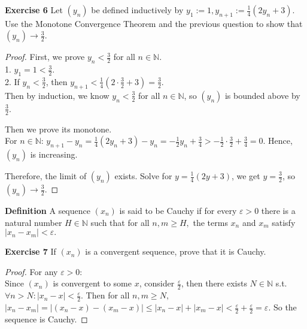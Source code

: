 \documentclass[12pt]{article}
\newcommand{\bbN}{\mathbb{N}}
\theoremstyle{definition}
\numberwithin{equation}{subsection}
\begin{document}
\textbf{Exercise 6} Let $\left(y_{n}\right)$ be defined inductively by $y_{1}:=1, y_{n+1}:=\frac{1}{4}\left(2 y_{n}+3\right)$.
Use the Monotone Convergence Theorem and the previous question to show that $\left(y_{n}\right) \rightarrow \frac{3}{2}$.
\begin{proof}
    First, we prove $y_n < \frac{3}{2}$ for all $n \in \bbN$. \\
    1. $y_1 = 1 < \frac{3}{2}$.\\
    2. If $y_n < \frac{3}{2}$, then $y_{n+1} < \frac{1}{4}(2\cdot\frac{3}{2}+3) = \frac{3}{2}$. \\
    Then by induction, we know $y_n < \frac{3}{2}$ for all $n \in \bbN$, so $(y_n)$ is bounded above by $\frac{3}{2}$. 

    \bigskip
    Then we prove its monotone. \\
    For $n \in \bbN$: 
    $y_{n+1} - y_n = \frac{1}{4}\left(2 y_{n}+3\right) - y_n = -\frac{1}{2}y_n + \frac{3}{4} > -\frac{1}{2}\cdot \frac{3}{2} + \frac{3}{4} = 0$.
    Hence, $(y_n)$ is increasing. 

    \bigskip

    Therefore, the limit of $(y_n)$ exists. Solve for $y=\frac{1}{4}\left(2 y+3\right)$, we get $y =\frac{3}{2}$, so $\left(y_{n}\right) \rightarrow \frac{3}{2}$.

\end{proof}


\textbf{Definition} A sequence $\left(x_{n}\right)$ is said to be Cauchy if for every $\varepsilon>0$ there is a natural number $H \in \mathbb{N}$ such that for all
$n, m \geq H,$ the terms $x_{n}$ and $x_{m}$ satisfy $\left|x_{n}-x_{m}\right|<\varepsilon .$
\bigskip

\textbf{Exercise 7} If $(x_n )$ is a convergent sequence, prove that it is Cauchy.

\begin{proof}
    For any $\varepsilon > 0$:\\
    Since $(x_n)$ is convergent to some $x$, consider $\frac{\varepsilon}{2}$, then there exists $N \in \bbN$ s.t. $\forall n > N: |x_n - x| < \frac{\varepsilon}{2}$. Then for all $n, m \geq N,$ $\left|x_{n}-x_{m}\right| = |(x_n - x) - (x_m - x)|\leq |x_n - x| + |x_m - x| < \frac{\varepsilon}{2}+ \frac{\varepsilon}{2} = \varepsilon .$ So the sequence is Cauchy. 
\end{proof}
\end{document}
